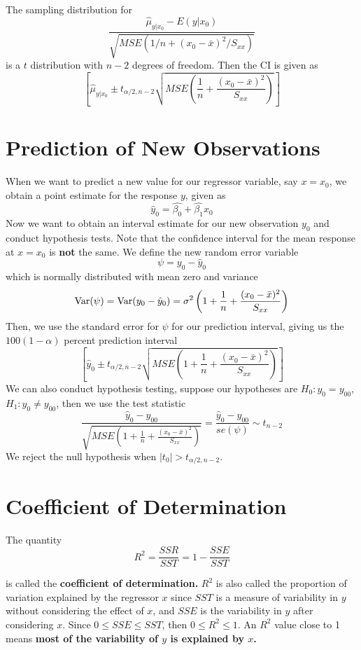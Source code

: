 The sampling distribution for 
\[\frac{\hat{\mu}_{y|x_0} - E(y|x_0)}{\sqrt{MSE(1/n + (x_0-\bar{x})^2/S_{xx})}}\]
is a $t$ distribution with $n-2$ degrees of freedom. Then the CI is given as 
\[\left[\hat{\mu}_{y|x_0} \pm t_{\alpha/2, n-2}\sqrt{MSE\left(\frac{1}{n} + \frac{(x_0 - \bar{x})^2}{S_{xx}}\right)} \right]\]


\section{Prediction of New Observations}

When we want to predict a new value for our regressor variable, say $x=x_0$, we obtain a point estimate for the response $y$, given as 
\[\hat{y}_0 = \hat{\beta_0} + \hat{\beta_1}x_0\]
Now we want to obtain an interval estimate for our new observation $y_0$ and conduct hypothesis tests. Note that the confidence interval for the mean response at $x=x_0$ is \textbf{not} the same. We define the new random error variable 
\[\psi = y_0 - \hat{y}_0\]
which is normally distributed with mean zero and variance 
\[\operatorname{Var}(\psi) = \operatorname{Var}(y_0 - \hat{y}_0) = \sigma^2\left(1+\frac{1}{n} + \frac{(x_0-\bar{x})^2}{S_{xx}}\right)\]
Then, we use the standard error for $\psi$ for our prediction interval, giving us the $100(1-\alpha)$ percent prediction interval 
\[\left[\hat{y}_0 \pm t_{\alpha/2, n-2} \sqrt{MSE\left(1+\frac{1}{n} + \frac{(x_0-\bar{x})^2}{S_{xx}}\right)}\right]\]
We can also conduct hypothesis testing, suppose our hypotheses are $H_0: y_0 = y_{00}$, $H_1: y_0 \neq y_{00}$, then we use the test statistic
\[\frac{\hat{y}_0 - y_{00}}{\sqrt{MSE\left(1+\frac{1}{n} + \frac{(x_0-\bar{x})^2}{S_{xx}}\right)}} = \frac{\hat{y}_0 - y_{00}}{se(\psi)}  \sim t_{n-2}\]
We reject the null hypothesis when $|t_0| > t_{\alpha/2, n-2}$.



\section{Coefficient of Determination}

The quantity 
\[R^2 = \frac{SSR}{SST} = 1 - \frac{SSE}{SST}\]

is called the \textbf{coefficient of determination.} $R^2$ is also called the proportion of variation explained by the regressor $x$ since $SST$ is a measure of variability in $y$ without considering the effect of $x$, and $SSE$ is the variability in $y$ after considering $x$. Since $0 \leq SSE \leq SST$, then $0 \leq R^2 \leq 1$. An $R^2$ value close to 1 means \textbf{most of the variability of $y$ is explained by $x$.}  


